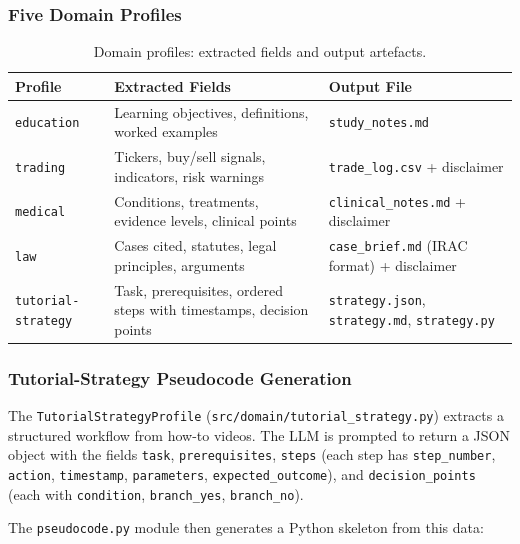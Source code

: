 \documentclass[12pt,a4paper]{article}
\begin{document}
\subsubsection{Five Domain Profiles}

\begin{table}[H]
\centering
\caption{Domain profiles: extracted fields and output artefacts.}
\label{tab:domains}
\begin{tabular}{@{}lp{5cm}p{4cm}@{}}
\toprule
\textbf{Profile} & \textbf{Extracted Fields} & \textbf{Output File} \\
\midrule
\texttt{education} & Learning objectives, definitions, worked examples & \texttt{study\_notes.md} \\
\addlinespace
\texttt{trading} & Tickers, buy/sell signals, indicators, risk warnings & \texttt{trade\_log.csv} + disclaimer \\
\addlinespace
\texttt{medical} & Conditions, treatments, evidence levels, clinical points & \texttt{clinical\_notes.md} + disclaimer \\
\addlinespace
\texttt{law} & Cases cited, statutes, legal principles, arguments & \texttt{case\_brief.md} (IRAC format) + disclaimer \\
\addlinespace
\texttt{tutorial-strategy} & Task, prerequisites, ordered steps with timestamps, decision points & \texttt{strategy.json}, \texttt{strategy.md}, \texttt{strategy.py} \\
\bottomrule
\end{tabular}
\end{table}

\subsubsection{Tutorial-Strategy Pseudocode Generation}
\label{subsubsec:pseudocode}

The \texttt{TutorialStrategyProfile} (\texttt{src/domain/tutorial\_strategy.py})
extracts a structured workflow from how-to videos. The LLM is prompted to return a
JSON object with the fields \texttt{task}, \texttt{prerequisites}, \texttt{steps}
(each step has \texttt{step\_number}, \texttt{action}, \texttt{timestamp},
\texttt{parameters}, \texttt{expected\_outcome}), and \texttt{decision\_points}
(each with \texttt{condition}, \texttt{branch\_yes}, \texttt{branch\_no}).

The \texttt{pseudocode.py} module then generates a Python skeleton from this data:
\end{document}
